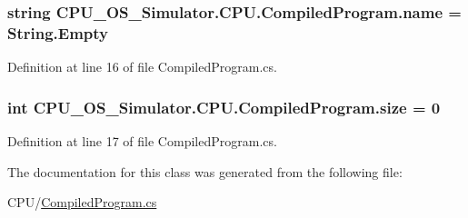 \hypertarget{class_c_p_u___o_s___simulator_1_1_c_p_u_1_1_compiled_program_afa16131ff99534fd4fe9bc4aaa21ac02}{}
\subsubsection[{name}]{\setlength{\rightskip}{0pt plus 5cm}string C\+P\+U\+\_\+\+O\+S\+\_\+\+Simulator.\+C\+P\+U.\+Compiled\+Program.\+name = String.\+Empty\hspace{0.3cm}{\ttfamily [private]}}\label{class_c_p_u___o_s___simulator_1_1_c_p_u_1_1_compiled_program_afa16131ff99534fd4fe9bc4aaa21ac02}


Definition at line 16 of file Compiled\+Program.\+cs.

\hypertarget{class_c_p_u___o_s___simulator_1_1_c_p_u_1_1_compiled_program_ac3d1adb46ebd2132f53d3a1b880acc58}{}
\subsubsection[{size}]{\setlength{\rightskip}{0pt plus 5cm}int C\+P\+U\+\_\+\+O\+S\+\_\+\+Simulator.\+C\+P\+U.\+Compiled\+Program.\+size = 0\hspace{0.3cm}{\ttfamily [private]}}\label{class_c_p_u___o_s___simulator_1_1_c_p_u_1_1_compiled_program_ac3d1adb46ebd2132f53d3a1b880acc58}


Definition at line 17 of file Compiled\+Program.\+cs.



The documentation for this class was generated from the following file\+:\begin{DoxyCompactItemize}
\item 
C\+P\+U/\hyperlink{_compiled_program_8cs}{Compiled\+Program.\+cs}\end{DoxyCompactItemize}
